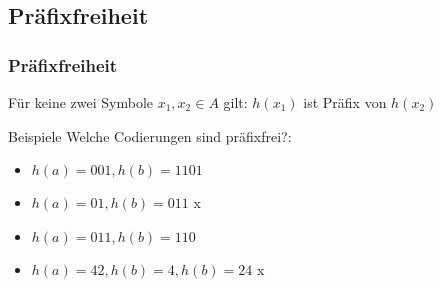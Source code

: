 \subsection{Präfixfreiheit}
\begin{frame}
	\frametitle{Präfixfreiheit}
	\begin{definition}
		Für keine zwei Symbole $x_1,x_2\in A$ gilt: $h(x_1)$ ist Präfix von $h(x_2)$
	\end{definition}
	\begin{exampleblock}{Beispiele}
		Welche Codierungen sind präfixfrei?:
		\begin{itemize}
			\item $h(a)=001, h(b)=1101 $ \pause \checkmark\\
			\item $h(a)=01, h(b)=011 $ \pause x\\
			\item $h(a)=011, h(b)=110 $ \pause \checkmark\\
			\item $h(a)=42, h(b)=4, h(b)=24 $ \pause x\\
		\end{itemize}

		
	\end{exampleblock}

\end{frame}




